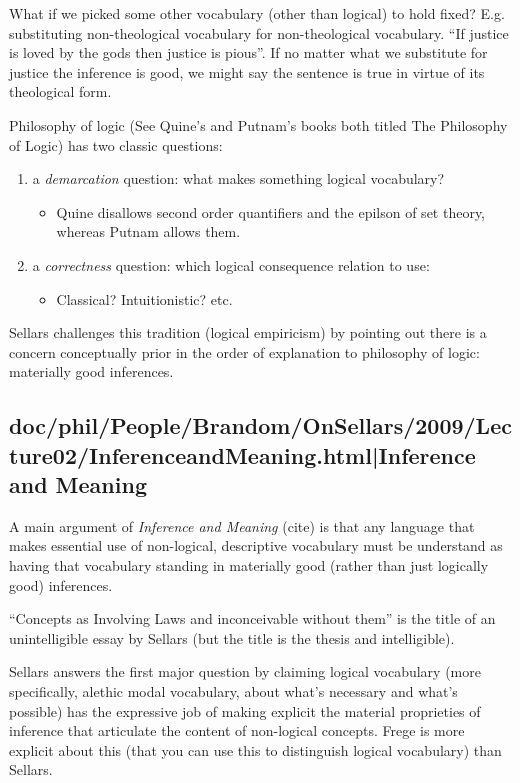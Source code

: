 \documentclass[12pt,a4paper]{report}
\begin{document}
What if we picked some other vocabulary (other than logical) to hold fixed? E.g.
substituting non-theological vocabulary for non-theological vocabulary.
``If justice is loved by the gods then justice is pious''. If no matter what we
substitute for justice the inference is good, we might say the sentence is true
in virtue of its theological form.

Philosophy of logic (See Quine's and Putnam's books both titled The Philosophy
of Logic) has two classic questions:
\begin{enumerate}
    \item a \emph{demarcation} question: what makes something logical vocabulary?
     \begin{itemize}
        \item Quine disallows second order quantifiers and the epilson of set
              theory, whereas Putnam allows them.
     \end{itemize}
    \item a \emph{correctness} question: which logical consequence relation to use:
      \begin{itemize}
      \item Classical? Intuitionistic? etc.
      \end{itemize}
\end{enumerate}

Sellars challenges this tradition (logical empiricism) by pointing out there is
a concern conceptually prior in the order of explanation to philosophy of
logic: materially good inferences.

\subsection{doc/phil/People/Brandom/OnSellars/2009/Lecture02/InferenceandMeaning.html|Inference and Meaning}

A main argument of \textit{Inference and Meaning} (cite) is that any language that makes essential use of non-logical, descriptive vocabulary must be understand as having that vocabulary standing in materially good (rather than just logically good) inferences.

``Concepts as Involving Laws and inconceivable without them'' is the title of an unintelligible essay by Sellars (but the title is the thesis and intelligible).

Sellars answers the first major question by claiming logical vocabulary (more specifically, alethic modal vocabulary, about what's necessary and what's possible) has the expressive job of making explicit the material proprieties of inference that articulate the content of non-logical concepts. Frege is more explicit about this (that you can use this to distinguish logical vocabulary) than Sellars.
\end{document}
